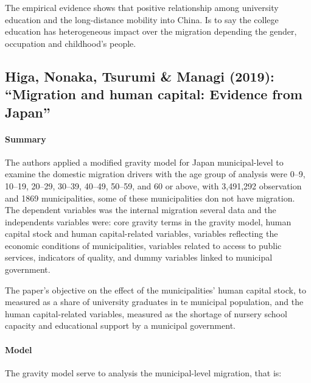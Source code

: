 \documentclass[11pt]{article}
\theoremstyle{prop}
\begin{document}
	The empirical evidence shows that positive relationship among university education and the long-distance mobility into China. Is to say the college education has heterogeneous impact over the migration depending the gender, occupation and childhood’s people.
	
	
	\subsection{Higa, Nonaka, Tsurumi \& Managi (2019): ``Migration and human capital: Evidence from Japan''}
	\paragraph{Summary}
	The authors applied a modified gravity model for Japan municipal-level to examine the domestic migration drivers with the age group of analysis were 0–9, 10–19, 20–29, 30–39, 40–49, 50–59, and 60 or above, with 3,491,292 observation and 1869 municipalities, some of these municipalities don not have migration. The dependent variables was the internal migration several data and the independents variables were: core gravity
	terms in the gravity model, human capital stock and human capital-related variables, variables reflecting the economic conditions of municipalities, variables related to access to public services, indicators of quality, and dummy variables linked to municipal government.
	
	The paper's objective on the effect of the municipalities' human capital stock, to measured as a share of university graduates in te municipal population, and the human capital-related variables, measured as the shortage of nursery school capacity and educational support by a municipal government.
	
	\paragraph {Model} The gravity model serve to analysis the  municipal-level migration, that is:
	
\end{document}
